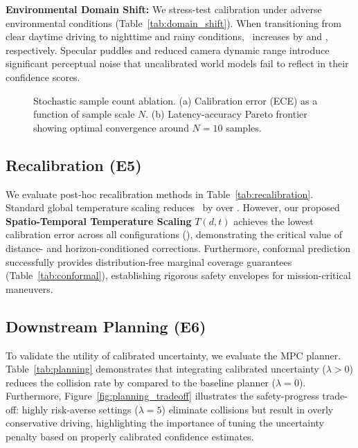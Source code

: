 \textbf{Environmental Domain Shift:} We stress-test calibration under adverse environmental conditions (Table~\ref{tab:domain_shift}). When transitioning from clear daytime driving to nighttime and rainy conditions, \ece~increases by  and , respectively. Specular puddles and reduced camera dynamic range introduce significant perceptual noise that uncalibrated world models fail to reflect in their confidence scores.

\begin{figure}[t]
\centering
\caption{Stochastic sample count ablation. (a) Calibration error (ECE) as a function of sample scale $N$. (b) Latency-accuracy Pareto frontier showing optimal convergence around $N=10$ samples.}
\label{fig:pareto}
\end{figure}

\subsection{Recalibration (E5)}
We evaluate post-hoc recalibration methods in Table~\ref{tab:recalibration}. Standard global temperature scaling reduces \ece~by over . However, our proposed \textbf{Spatio-Temporal Temperature Scaling} $T(d, t)$ achieves the lowest calibration error across all configurations (), demonstrating the critical value of distance- and horizon-conditioned corrections. Furthermore, conformal prediction successfully provides distribution-free marginal coverage guarantees (Table~\ref{tab:conformal}), establishing rigorous safety envelopes for mission-critical maneuvers.

\subsection{Downstream Planning (E6)}
To validate the utility of calibrated uncertainty, we evaluate the MPC planner. Table~\ref{tab:planning} demonstrates that integrating calibrated uncertainty ($\lambda > 0$) reduces the collision rate by  compared to the baseline planner ($\lambda = 0$). Furthermore, Figure~\ref{fig:planning_tradeoff} illustrates the safety-progress trade-off: highly risk-averse settings ($\lambda = 5$) eliminate collisions but result in overly conservative driving, highlighting the importance of tuning the uncertainty penalty based on properly calibrated confidence estimates.
